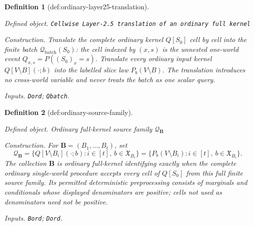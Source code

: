 \documentclass{article}
\newtheorem{definition}{Definition}
\begin{document}
\begin{definition}[def:ordinary-layer25-translation]\label{def:ordinary-layer25-translation}
\par\smallskip\noindent\emph{Defined object.} \texttt{Cellwise Layer-\allowbreak{}2.5 translation of an ordinary full kernel}
\par\smallskip\noindent\emph{Construction.} Translate the complete ordinary kernel \(Q[S_0]\) cell by cell into the finite batch \(\mathcal Q_{\mathrm{batch}}(S_0)\): the cell indexed by \((x,s)\) is the unnested one-world event \(Q_{x,s}=P((S_0)_x=s)\).  Translate every ordinary input kernel \(Q[V\setminus B](\cdot;b)\) into the labelled slice law \(P_b(V\setminus B)\).  The translation introduces no cross-world variable and never treats the batch as one scalar query.
\par\smallskip\noindent\emph{Inputs.} \texttt{Dord}; \texttt{Qbatch}.
\end{definition}

\begin{definition}[def:ordinary-source-family]\label{def:ordinary-source-family}
\par\smallskip\noindent\emph{Defined object.} Ordinary full-kernel source family \(\mathcal Q_{\mathbf B}\)
\par\smallskip\noindent\emph{Construction.} For \(\mathbf B=(B_1,\ldots,B_t)\), set
\[
 \mathcal Q_{\mathbf B}
 =\{Q[V\setminus B_i](\cdot;b):i\in[t],\ b\in\mathfrak X_{B_i}\}
 =\{P_b(V\setminus B_i):i\in[t],\ b\in\mathfrak X_{B_i}\}.
\]
The collection \(\mathbf B\) is ordinary full-kernel identifying exactly when the complete ordinary single-world procedure accepts every cell of \(Q[S_0]\) from this full finite source family.  Its permitted deterministic preprocessing consists of marginals and conditionals whose displayed denominators are positive; cells not used as denominators need not be positive.
\par\smallskip\noindent\emph{Inputs.} \texttt{Bord}; \texttt{Dord}.
\end{definition}
\end{document}
